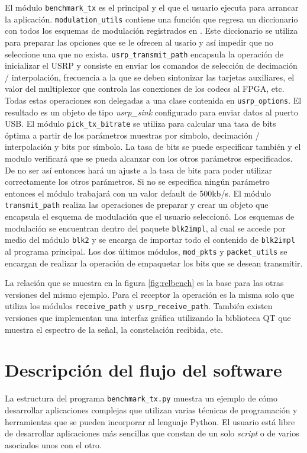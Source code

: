 El m\'odulo \verb|benchmark_tx| es el principal y el que el usuario ejecuta para arrancar la
aplicaci\'on. \verb|modulation_utils| contiene una funci\'on que regresa un diccionario con todos los
esquemas de modulaci\'on registrados en \gnuradio. Este diccionario se utiliza para preparar las
opciones que se le ofrecen al usario y as\'i impedir que no seleccione una que no exista.
\verb|usrp_transmit_path| encapsula la operaci\'on de inicializar el USRP y consiste en enviar los
comandos de selecci\'on de decimaci\'on / interpolaci\'on, frecuencia a la que se deben
sintonizar las tarjetas auxiliares, el valor del multiplexor que controla las conexiones de los codecs al FPGA,
etc. Todas estas operaciones son delegadas a una clase contenida en \verb|usrp_options|. El
resultado es un objeto de tipo \emph{usrp\_sink} configurado para enviar datos al puerto USB. El
m\'odulo \verb|pick_tx_bitrate| se utiliza para calcular una tasa de bits \'optima a partir de los
par\'ametros muestras por s\'imbolo, decimaci\'on / interpolaci\'on y bits por s\'imbolo.
La tasa de bits se puede especificar tambi\'en y el modulo verificar\'a que se pueda alcanzar con los otros
par\'ametros especificados. De no ser as\'i entonces har\'a un ajuste a la tasa de bits para poder
utilizar correctamente los otros par\'ametros. Si no se especifica ning\'un par\'ametro entonces el
m\'odulo trabajar\'a con un valor default de 500kb/s.
El m\'odulo \verb|transmit_path| realiza las operaciones de preparar y crear un objeto que encapsula
el esquema de modulaci\'on que el usuario seleccion\'o. Los esquemas de modulaci\'on se encuentran
dentro del paquete \verb|blk2impl|, al cual se accede por medio del m\'odulo \verb|blk2| y se
encarga de importar todo el contenido de \verb|blk2impl| al programa principal. Los dos \'ultimos
m\'odulos, \verb|mod_pkts| y \verb|packet_utils| se encargan de realizar la operaci\'on de
empaquetar los bits que se desean transmitir.

La relaci\'on que se muestra en la figura \ref{fig:relbench} es la base para las otras versiones
del mismo ejemplo. Para el receptor la operaci\'on es la misma solo que utiliza los m\'odulos
\verb|receive_path| y \verb|usrp_receive_path|. Tambi\'en existen versiones que implementan una
interfaz gr\'afica utilizando la biblioteca QT que muestra el espectro de la se\~nal, la constelaci\'on
recibida, etc.

\section{Descripci\'on del flujo del software}
La estructura del programa \verb|benchmark_tx.py| muestra un ejemplo de c\'omo desarrollar
aplicaciones complejas que utilizan varias t\'ecnicas de programaci\'on y herramientas que se pueden
incorporar al lenguaje Python. El usuario est\'a libre de desarrollar aplicaciones m\'as sencillas
que constan de un solo \emph{script} o de varios asociados unos con el otro. 

